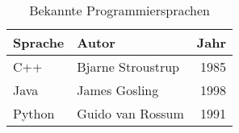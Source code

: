 \begin{table}[h]
    \centering
    \begin{tabular}{llr}
        \toprule
        Sprache & Autor             & Jahr \\
        \midrule
        C++     & Bjarne Stroustrup & 1985 \\
        Java    & James Gosling     & 1998 \\
        Python  & Guido van Rossum  & 1991 \\
        \bottomrule
    \end{tabular}
    \caption{Bekannte Programmiersprachen}
\end{table}

